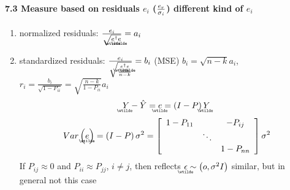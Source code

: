 \documentclass{article}
\begin{document}
\bigskip

\bigskip

\paragraph{7.3 Measure based on residuals $e_{i}$ ($\frac{e_{r}}{\protect%
\sigma _{i}}$) different kind of $e_{i}$}

\begin{enumerate}
\item normalized residuals: $\frac{e_{i}}{\sqrt{%
\underaccent{\wtilde}{e}%
^{\dagger }%
\underaccent{\wtilde}{e}%
}}=a_{i}$

\item standardized residuals: $\frac{e_{i}}{\sqrt{\frac{%
\underaccent{\wtilde}{e}%
^{\dagger }%
\underaccent{\wtilde}{e}%
}{n-k}}}=b_{i}$ (MSE)\newline
$b_{i}=\sqrt{n-k}a_{i}$, $r_{i}=\frac{b_{i}}{\sqrt{1-P_{ii}}}=\sqrt{\frac{n-k%
}{1-P_{ii}}}a_{i}$%
\begin{equation*}
\underaccent{\wtilde}{Y}%
-\hat{Y}=%
\underaccent{\wtilde}{e}%
=\left( I-P\right) 
\underaccent{\wtilde}{Y}%
\end{equation*}%
\begin{equation*}
Var\left( 
\underaccent{\wtilde}{e}%
\right) =\left( I-P\right) \sigma ^{2}=\left[ 
\begin{array}{ccc}
1-P_{11} &  & -P_{ij} \\ 
& \ddots &  \\ 
&  & 1-P_{nn}%
\end{array}%
\right] \sigma ^{2}
\end{equation*}%
If $P_{ij}\approx 0$ and $P_{ii}\approx P_{jj}$, $i\neq j$, then reflects $%
\underaccent{\wtilde}{\epsilon}%
\sim \left( o,\sigma ^{2}I\right) $ similar, but in general not this case


\end{enumerate}
\end{document}
